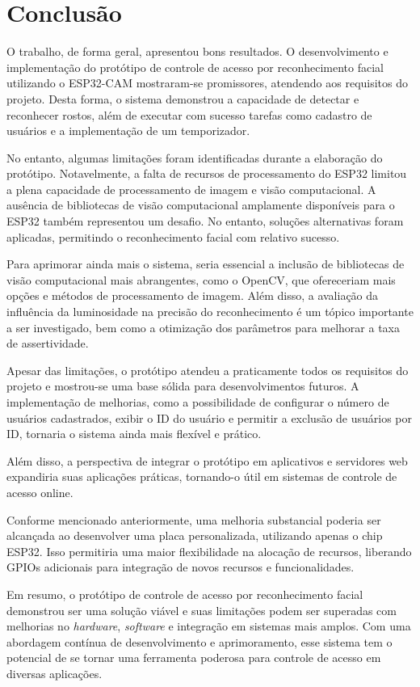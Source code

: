 \chapter{Conclusão}\label{cap:conclusoeseperspectivas}

O trabalho, de forma geral, apresentou bons resultados. O desenvolvimento e 
implementação do protótipo de controle de acesso por 
reconhecimento facial utilizando o ESP32-CAM mostraram-se promissores, atendendo 
aos requisitos do projeto. Desta forma, o sistema demonstrou 
a capacidade de detectar e reconhecer rostos, além de executar com sucesso 
tarefas como cadastro de usuários e a implementação de um temporizador.

No entanto, algumas limitações foram identificadas durante a elaboração do 
protótipo. Notavelmente, a falta de recursos de processamento do ESP32 limitou 
a plena capacidade de processamento de imagem e visão computacional. 
A ausência de bibliotecas de visão computacional amplamente disponíveis 
para o ESP32 também representou um desafio. No entanto, soluções alternativas 
foram aplicadas, permitindo o reconhecimento facial com relativo sucesso.

Para aprimorar ainda mais o sistema, seria essencial a inclusão de bibliotecas 
de visão computacional mais abrangentes, como o OpenCV, que ofereceriam mais 
opções e métodos de processamento de imagem. Além disso, a avaliação da 
influência da luminosidade na precisão do reconhecimento é um tópico importante 
a ser investigado, bem como a otimização dos parâmetros para melhorar a taxa 
de assertividade.

Apesar das limitações, o protótipo atendeu a praticamente todos os requisitos 
do projeto e mostrou-se uma base sólida para desenvolvimentos futuros. A 
implementação de melhorias, como a possibilidade de configurar o número de 
usuários cadastrados, exibir o ID do usuário e permitir a exclusão de usuários 
por ID, tornaria o sistema ainda mais flexível e prático. 

Além disso, a perspectiva de integrar o protótipo em aplicativos e servidores 
web expandiria suas aplicações práticas, tornando-o útil em sistemas de controle 
de acesso online.

Conforme mencionado anteriormente, uma melhoria substancial poderia ser alcançada 
ao desenvolver uma placa personalizada, utilizando apenas o chip ESP32. Isso permitiria 
uma maior flexibilidade na alocação de recursos, liberando GPIOs adicionais 
para integração de novos recursos e funcionalidades.

Em resumo, o protótipo de controle de acesso por reconhecimento facial 
demonstrou ser uma solução viável e suas limitações podem ser superadas 
com melhorias no \textit{hardware}, \textit{software} e integração em sistemas mais amplos. 
Com uma abordagem contínua de desenvolvimento e aprimoramento, esse sistema 
tem o potencial de se tornar uma ferramenta poderosa para controle de acesso 
em diversas aplicações.